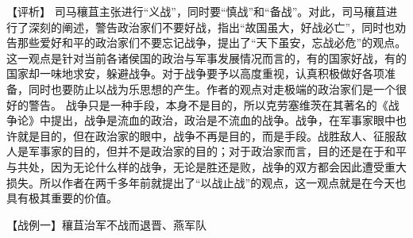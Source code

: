 \documentclass[a4paper,12pt,UTF8,twoside]{ctexbook}
\begin{document}
【评析】
司马穰苴主张进行“义战”，同时要“慎战”和“备战”。对此，司马穰苴进行了深刻的阐述，警告政治家们不要好战，指出“故国虽大，好战必亡”，同时也劝告那些爱好和平的政治家们不要忘记战争，提出了“天下虽安，忘战必危”的观点。这一观点是针对当前各诸侯国的政治与军事发展情况而言的，有的国家好战，有的国家却一味地求安，躲避战争。对于战争要予以高度重视，认真积极做好各项准备，同时也要防止以战为乐思想的产生。作者的观点对走极端的政治家们是一个很好的警告。
战争只是一种手段，本身不是目的，所以克劳塞维茨在其著名的《战争论》中提出，战争是流血的政治，政治是不流血的战争。战争，在军事家眼中也许就是目的，但在政治家的眼中，战争不再是目的，而是手段。战胜敌人、征服敌人是军事家的目的，但并不是政治家的目的；对于政治家而言，目的还是在于和平与共处，因为无论什么样的战争，无论是胜还是败，战争的双方都会因此遭受重大损失。所以作者在两千多年前就提出了“以战止战”的观点，这一观点就是在今天也具有极其重要的价值。


【战例一】穰苴治军不战而退晋、燕军队
\end{document}
